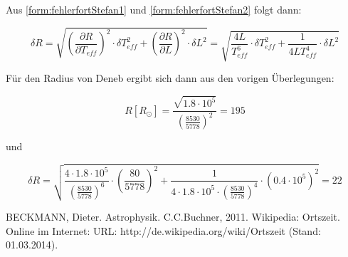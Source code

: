 \documentclass[titlepage]{scrartcl}
\begin{document}
Aus \eqref{form:fehlerfortStefan1} und \eqref{form:fehlerfortStefan2} folgt dann:

\begin{equation}
\delta R = \sqrt{(\frac{\partial R}{\partial T_{eff}})^2 \cdot \delta T^2_{eff} + (\frac{\partial R}{\partial L})^2 \cdot \delta L^2} = \sqrt{\frac{4 L}{T^6_{eff}} \cdot \delta T^2_{eff} + \frac{1}{4 L T^4_{eff}} \cdot \delta L^2}
\end{equation}

Für den Radius von Deneb ergibt sich dann aus den vorigen Überlegungen:

\begin{equation}
R[R_{\odot}] = \frac{\sqrt{1.8 \cdot 10^5}} {(\frac{8530}{5778})^2} = 195
\end{equation}

und

\begin{equation}
\delta R = \sqrt{\frac{4 \cdot 1.8 \cdot 10^5}{({\frac{8530}{5778}})^6} \cdot (\frac{80}{5778})^2 + \frac{1}{4 \cdot 1.8 \cdot 10^5 \cdot ({\frac{8530}{5778}})^4} \cdot (0.4 \cdot 10^5)^2} = 22
\end{equation}


\newpage

\begin{thebibliography}{9}
 BECKMANN, Dieter. Astrophysik. C.C.Buchner, 2011.
 Wikipedia: Ortszeit. Online im Internet: URL: http://de.wikipedia.org/wiki/Ortszeit (Stand: 01.03.2014). 


\end{thebibliography}
\end{document}
